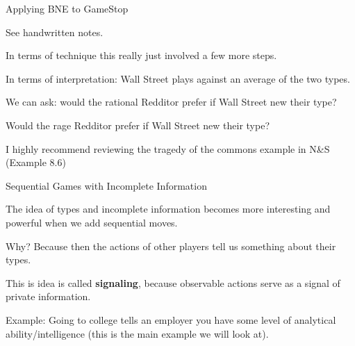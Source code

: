 \documentclass[aspectratio=169]{beamer}
\newenvironment{wideitemize}{\itemize\addtolength{\itemsep}{10pt}}{\enditemize}
\begin{document}
\begin{frame}{Applying BNE to GameStop}

See handwritten notes.\pause
\begin{wideitemize}
    \item In terms of technique this really just involved a few more steps.
    \item In terms of interpretation: Wall Street plays against an average of the two types.
    \item We can ask: would the rational Redditor prefer if Wall Street new their type?
    \item Would the rage Redditor prefer if Wall Street new their type?
    \item I highly recommend reviewing the tragedy of the commons example in N\&S (Example 8.6)
\end{wideitemize}
    
\end{frame}

\begin{frame}{Sequential Games with Incomplete Information}
\begin{wideitemize}
    \item The idea of types and incomplete information becomes more interesting and powerful when we add sequential moves.
    \item Why? Because then the actions of other players tell us something about their types.
    \item This is idea is called \textbf{signaling}, because observable actions serve as a signal of private information.
    \item Example: Going to college tells an employer you have some level of analytical ability/intelligence (this is the main example we will look at).
\end{wideitemize}
    
\end{frame}
\end{document}
